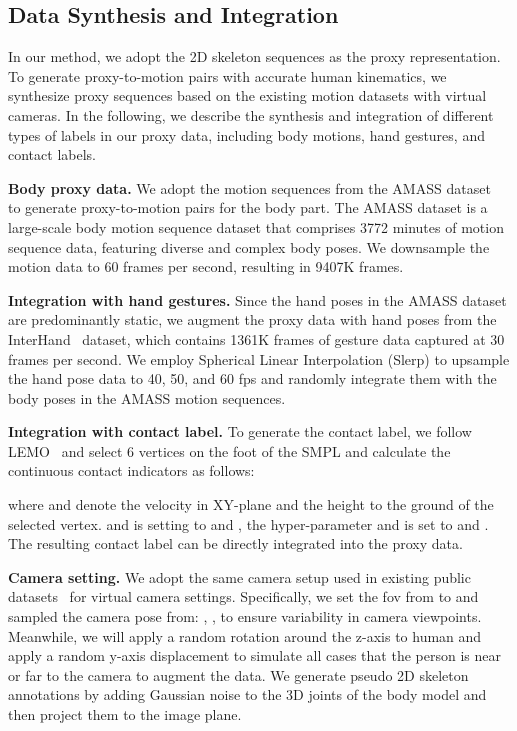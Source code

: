 \documentclass[10pt,twocolumn,letterpaper]{article}
\begin{document}
\subsection{Data Synthesis and Integration}
\label{subsec:synthetic_data_generation}
In our method, we adopt the 2D skeleton sequences as the proxy representation.
To generate proxy-to-motion pairs with accurate human kinematics, we synthesize proxy sequences based on the existing motion datasets with virtual cameras.
In the following, we describe the synthesis and integration of different types of labels in our proxy data, including body motions, hand gestures, and contact labels.


\noindent \textbf{Body proxy data.} We adopt the motion sequences from the AMASS dataset~\cite{mahmood2019amass} to generate proxy-to-motion pairs for the body part.
The AMASS dataset is a large-scale body motion sequence dataset that comprises 3772 minutes of motion sequence data, featuring diverse and complex body poses.
We downsample the motion data to 60 frames per second, resulting in 9407K frames.

\noindent \textbf{Integration with hand gestures.} Since the hand poses in the AMASS dataset are predominantly static, we augment the proxy data with hand poses from the InterHand~\cite{moon2020interhand2} dataset, which contains 1361K frames of gesture data captured at 30 frames per second.
We employ Spherical Linear Interpolation (Slerp) to upsample the hand pose data to 40, 50, and 60 fps and randomly integrate them with the body poses in the AMASS motion sequences.


\noindent \textbf{Integration with contact label.} To generate the contact label, we follow LEMO~\cite{lemo} and select 6 vertices on the foot of the SMPL and calculate the continuous contact indicators as follows:

where  and  denote the velocity in XY-plane and the height to the ground of the selected vertex.  and  is setting to  and , the hyper-parameter  and  is set to  and .
The resulting contact label can be directly integrated into the proxy data.

\noindent \textbf{Camera setting.} We adopt the same camera setup used in existing public datasets~\cite{ionescu2014human3,vonMarcard2018} for virtual camera settings.
Specifically, we set the fov from  to  and sampled the camera pose from: , , to ensure variability in camera viewpoints.
Meanwhile, we will apply a random rotation  around the z-axis to human and apply a random y-axis displacement  to simulate all cases that the person is near or far to the camera to augment the data.
We generate pseudo 2D skeleton annotations by adding Gaussian noise  to the 3D joints of the body model and then project them to the image plane.
\end{document}
